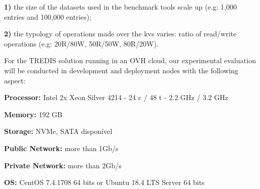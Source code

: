 \textbf{1)} the size of the datasets used in the benchmark tools scale up (e.g: 1,000 entries and 100,000 entries);

\textbf{2)} the typology of operations made over the \gls{kvs} varies: ratio of read/write operations (e.g: 20R/80W, 50R/50W, 80R/20W).


For the TREDIS solution running in an OVH cloud, our experimental evaluation will be conducted in development and deployment nodes with the following aspect:

\textbf{Processor:} Intel 2x Xeon Silver 4214 - 24 c / 48 t - 2.2 GHz / 3.2 GHz

\textbf{Memory:} 192 GB

\textbf{Storage:} NVMe, SATA disponível

\textbf{Public Network:} more than 1Gb/s

\textbf{Private Network:} more than 2Gb/s

\textbf{OS:} CentOS 7.4.1708 64 bits or Ubuntu 18.4 LTS Server 64 bits



% 
% 
% 
% 



